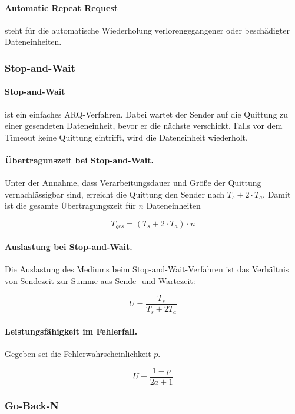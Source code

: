 \documentclass[]{scrartcl}
\begin{document}
\paragraph{\underline{A}utomatic \underline{R}epeat Re\underline{q}uest} steht f\"ur die automatische Wiederholung verlorengegangener oder besch\"adigter Dateneinheiten.

\subsubsection{Stop-and-Wait}
\paragraph{Stop-and-Wait} ist ein einfaches ARQ-Verfahren. Dabei wartet der Sender auf die Quittung zu einer gesendeten Dateneinheit, bevor er die n\"achste verschickt. Falls vor dem Timeout keine Quittung eintrifft, wird die Dateneinheit wiederholt.


\paragraph{\"Ubertragunszeit bei Stop-and-Wait.} Unter der Annahme, dass Verarbeitungsdauer und Gr\"o{\ss}e der Quittung vernachl\"assigbar sind, erreicht die Quittung den Sender nach $T_{s} + 2 \cdot T_{a}$. Damit ist die gesamte \"Ubertragungszeit f\"ur $n$ Dateneinheiten

$$T_{ges} = (T_{s} + 2 \cdot T_{a}) \cdot n$$


\paragraph{Auslastung bei Stop-and-Wait.} Die Auslastung des Mediums beim Stop-and-Wait-Verfahren ist das Verh\"altnis von Sendezeit zur Summe aus Sende- und Wartezeit:

$$U = \frac{T_{s}}{T_{s} + 2 T_{a}}$$


\paragraph{Leistungsf\"ahigkeit im Fehlerfall.} Gegeben sei die Fehlerwahrscheinlichkeit $p$.

$$U = \frac{1-p}{2a + 1}$$

\subsubsection{Go-Back-N}
\end{document}
